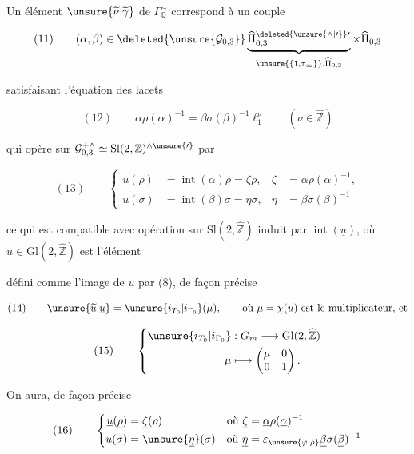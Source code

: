 Un élément $\unsure{\widetilde{\nu}|\widetilde{\gamma}}$ de
$\Gamma_{\mathbb Q}^{\sim}$ correspond à un couple

\[
(11)\qquad
(\alpha,\beta)\in
\deleted{\unsure{\mathcal{G}_{0,3}}}
\underbrace{\widehat{\Pi}_{0,3}^{\deleted{\unsure{\wedge|\prime}}\prime}}_{
 \unsure{\{1,\tau_\infty\}}.\widehat{\Pi}_{0,3}}
\times\widehat{\Pi}_{0,3}
\]

satisfaisant  l'équation des lacets

\[
(12)\qquad
\alpha\rho(\alpha)^{-1}=\beta\sigma(\beta)^{-1}\ell_1^\nu
\qquad (\nu\in\widehat{\mathbb Z})
\]

qui opère sur $\mathcal{G}_{0,3}^{+\wedge}\simeq
\mathrm{Sl}(2,\mathbb Z)^{\wedge\unsure{\prime}}$ par

\[
(13)\qquad
\left\{\begin{aligned}
u(\rho)&=\operatorname{int}(\alpha)\rho=\zeta\rho,
&\zeta&=\alpha\rho(\alpha)^{-1},\\
u(\sigma)&=\operatorname{int}(\beta)\sigma=\eta\sigma,
&\eta&=\beta\sigma(\beta)^{-1}
\end{aligned}\right.
\]

ce qui est compatible avec  opération
sur $\mathrm{Sl}(2,\widehat{\mathbb Z})$ induit
par $\operatorname{int}(\underline{u})$, où
$\underline{u}\in\mathrm{Gl}(2,\widehat{\mathbb Z})$ est l'élément



défini  comme l'image de $u$ par (8), de
façon précise

\[
(14)\qquad
\unsure{\widetilde{u}|\underline{u}}=
\unsure{i_{T_0}|i_{\Gamma_0}}(\mu),\qquad
\text{où }\mu=\chi(u)\text{ est le multiplicateur, et}
\]

\[
(15)\qquad
\left\{\begin{aligned}
\unsure{i_{T_0}|i_{\Gamma_0}} &:G_m\longrightarrow
\mathrm{Gl}(2,\widehat{\mathbb Z})\\
\mu&\longmapsto\begin{pmatrix}\mu&0\\0&1\end{pmatrix}.
\end{aligned}\right.
\]

On aura, de façon précise

\[
(16)\qquad
\left\{\begin{aligned}
\underline{u}(\underline{\rho})&=\underline{\zeta}(\rho)
&\text{où }\underline{\zeta}&=\underline{\alpha}\rho(\underline{\alpha})^{-1}\\
\underline{u}(\underline{\sigma})&=\unsure{\underline{\eta}}(\sigma)
&\text{où }\underline{\eta}&=\varepsilon_{\unsure{\varphi|\rho}}
\underline{\beta}\sigma(\underline{\beta})^{-1}
\end{aligned}\right.
\]


